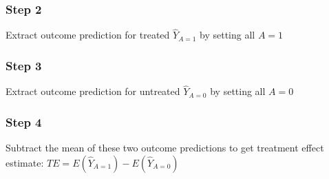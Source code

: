 \documentclass[
]{book}
\newenvironment{Shaded}{\begin{snugshade}}{\end{snugshade}}
\newcommand{\AttributeTok}[1]{\textcolor[rgb]{0.77,0.63,0.00}{#1}}
\newcommand{\DecValTok}[1]{\textcolor[rgb]{0.00,0.00,0.81}{#1}}
\newcommand{\FunctionTok}[1]{\textcolor[rgb]{0.00,0.00,0.00}{#1}}
\newcommand{\NormalTok}[1]{#1}
\newcommand{\OtherTok}[1]{\textcolor[rgb]{0.56,0.35,0.01}{#1}}
\newcommand{\SpecialCharTok}[1]{\textcolor[rgb]{0.00,0.00,0.00}{#1}}
\newcommand{\StringTok}[1]{\textcolor[rgb]{0.31,0.60,0.02}{#1}}
\begin{document}
\hypertarget{step-2}{%
\subsubsection{Step 2}\label{step-2}}

Extract outcome prediction for treated \(\hat{Y}_{A=1}\) by setting all \(A=1\)\textbar{}

\begin{Shaded}
\end{Shaded}

\hypertarget{step-3}{%
\subsubsection{Step 3}\label{step-3}}

Extract outcome prediction for untreated \(\hat{Y}_{A=0}\) by setting all \(A=0\)

\begin{Shaded}
\end{Shaded}

\hypertarget{step-4}{%
\subsubsection{Step 4}\label{step-4}}

Subtract the mean of these two outcome predictions to get treatment effect estimate: \(TE = E(\hat{Y}_{A=1}) - E(\hat{Y}_{A=0})\)
\end{document}
